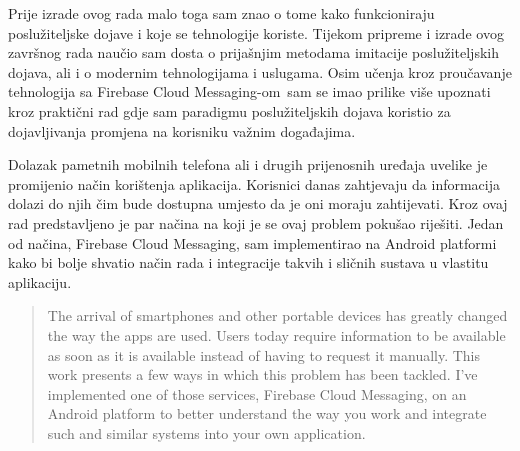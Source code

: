 \documentclass[times, utf8, zavrsni]{fer}
\begin{document}
Prije izrade ovog rada malo toga sam znao o tome kako funkcioniraju poslužiteljske dojave i koje se tehnologije koriste. Tijekom pripreme i izrade ovog završnog rada naučio sam dosta o prijašnjim metodama imitacije poslužiteljskih dojava, ali i o modernim tehnologijama i uslugama. Osim učenja kroz proučavanje tehnologija sa \glqq Firebase Cloud Messaging-om\grqq\  sam se imao prilike više upoznati kroz praktični rad gdje sam paradigmu poslužiteljskih dojava koristio za dojavljivanja promjena na korisniku važnim događajima.




\begin{sazetak}
Dolazak pametnih mobilnih telefona ali i drugih prijenosnih uređaja uvelike je promijenio način korištenja aplikacija. Korisnici danas zahtjevaju da informacija dolazi do njih čim bude dostupna umjesto da je oni moraju zahtijevati. Kroz ovaj rad predstavljeno je par načina na koji je se ovaj problem pokušao riješiti. Jedan od načina, Firebase Cloud Messaging, sam implementirao na Android platformi kako bi bolje shvatio način rada i integracije takvih i sličnih sustava u vlastitu aplikaciju.

\end{sazetak}

\begin{abstract}
The arrival of smartphones and other portable devices has greatly changed the way the apps are used. Users today require information to be available as soon as it is available instead of having to request it manually. This work presents a few ways in which this problem has been tackled. I've implemented one of those services, Firebase Cloud Messaging, on an Android platform to better understand the way you work and integrate such and similar systems into your own application.

\end{abstract}
\end{document}
